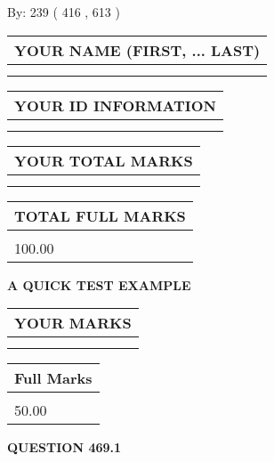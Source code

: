 \documentclass[12pt]{article}
\begin{document}
   
\hspace{1.0in} By: 
 239 ( 416 ,  613 )
   
   
   
   
\newpage 
\setcounter{page}{ 
   469001 } 
   
   
   
   
\noindent\begin{tabular}{|l|}
\hline
YOUR NAME (FIRST, ... LAST)  \\
\hline
 \\ 
 \\ 
\hline
\end{tabular}
\hspace{0.05in} \begin{tabular}{|l|}
\hline
 YOUR   ID   INFORMATION  \\
\hline
 \\ 
 \\ 
\hline
\end{tabular}
   
   
\vspace{0.2in}\noindent\begin{tabular}{|l|}
\hline
YOUR TOTAL MARKS  \\
\hline
 \\ 
 \\ 
\hline
\end{tabular}
\hspace{0.05in} \begin{tabular}{|l|}
\hline
TOTAL FULL MARKS  \\
\hline
 \\ 
100.00 \\
\hline
\end{tabular}
   
   
 \vspace{0.2in}
{\LARGE {\textbf{ A QUICK TEST EXAMPLE}}}
   
   
  
\vspace{0.2in}
  
\noindent\begin{tabular}{|l|}
\hline
 YOUR MARKS  \\
\hline
 \\ 
 \\ 
\hline
\end{tabular}
\hspace{0.05in} \begin{tabular}{|l|}
\hline
 Full Marks  \\
\hline
 \\ 
50.00 \\
\hline
\end{tabular}
{\textbf{\Large{QUESTION
469.1 
}}}
  
\end{document}
